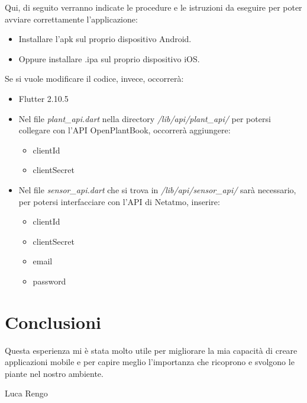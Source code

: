 \documentclass[a4paper,12pt]{report}
\begin{document}
\textsf{\small Qui, di seguito verranno indicate le procedure e le istruzioni da eseguire per poter avviare correttamente l'applicazione: }

\begin{itemize}
	\item \textsf{\small Installare l'apk sul proprio dispositivo Android.}
	\item \textsf{\small Oppure installare .ipa sul proprio dispositivo iOS.}
\end{itemize}

\textsf{\small Se si vuole modificare il codice, invece, occorrerà:}

\begin{itemize}
	\item \textsf{\small Flutter 2.10.5}
	\item \textsf{\small Nel file \emph{plant\_api.dart} nella directory \emph{/lib/api/plant\_api/} per potersi collegare con l'API OpenPlantBook, occorrerà aggiungere: }
	\begin{itemize}
		\item \textsf{\small clientId}
		\item \textsf{\small clientSecret}
	\end{itemize}
	\item \textsf{\small Nel file \emph{sensor\_api.dart} che si trova in \emph{/lib/api/sensor\_api/} sarà necessario, per potersi interfacciare con l'API di Netatmo, inserire: }
	\begin{itemize}
		\item \textsf{\small clientId}
		\item \textsf{\small clientSecret}
		\item \textsf{\small email}
		\item \textsf{\small password}
	\end{itemize}
\end{itemize}


\section{Conclusioni}

\textsf{\small Questa esperienza mi è stata molto utile per migliorare la mia capacità di creare applicazioni mobile e per capire meglio l'importanza che ricoprono e svolgono le piante nel nostro ambiente.}\break

\textsf{\small Luca Rengo}
\end{document}
